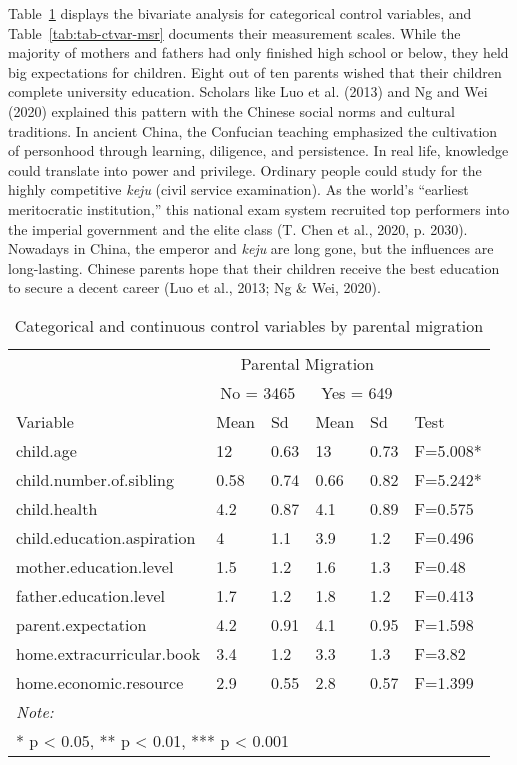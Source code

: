 \documentclass[
  man,floatsintext]{apa7}
\begin{document}
\newpage

Table~\ref{tab:tab-ctvar-cnt} displays the bivariate analysis for categorical control variables, and Table~\ref{tab:tab-ctvar-msr} documents their measurement scales. While the majority of mothers and fathers had only finished high school or below, they held big expectations for children. Eight out of ten parents wished that their children complete university education. Scholars like Luo et al. (2013) and Ng and Wei (2020) explained this pattern with the Chinese social norms and cultural traditions. In ancient China, the Confucian teaching emphasized the cultivation of personhood through learning, diligence, and persistence. In real life, knowledge could translate into power and privilege. Ordinary people could study for the highly competitive \emph{keju} (civil service examination). As the world's ``earliest meritocratic institution,'' this national exam system recruited top performers into the imperial government and the elite class (T. Chen et al., 2020, p. 2030). Nowadays in China, the emperor and \emph{keju} are long gone, but the influences are long-lasting. Chinese parents hope that their children receive the best education to secure a decent career (Luo et al., 2013; Ng \& Wei, 2020).

\begin{table}

\caption{\label{tab:tab-ctvar-cnt}Categorical and continuous control variables by parental migration}
\centering
\begin{tabular}[t]{llllll}
\toprule
\multicolumn{1}{c}{ } & \multicolumn{4}{c}{Parental Migration} \\
\cmidrule(l{3pt}r{3pt}){2-5}
\multicolumn{1}{c}{ } & \multicolumn{2}{c}{No = 3465} & \multicolumn{2}{c}{Yes = 649} \\
\cmidrule(l{3pt}r{3pt}){2-3} \cmidrule(l{3pt}r{3pt}){4-5}
Variable & Mean & Sd & Mean & Sd & Test\\
\midrule
child.age & 12 & 0.63 & 13 & 0.73 & F=5.008*\\
child.number.of.sibling & 0.58 & 0.74 & 0.66 & 0.82 & F=5.242*\\
child.health & 4.2 & 0.87 & 4.1 & 0.89 & F=0.575\\
child.education.aspiration & 4 & 1.1 & 3.9 & 1.2 & F=0.496\\
mother.education.level & 1.5 & 1.2 & 1.6 & 1.3 & F=0.48\\
\addlinespace
father.education.level & 1.7 & 1.2 & 1.8 & 1.2 & F=0.413\\
parent.expectation & 4.2 & 0.91 & 4.1 & 0.95 & F=1.598\\
home.extracurricular.book & 3.4 & 1.2 & 3.3 & 1.3 & F=3.82\\
home.economic.resource & 2.9 & 0.55 & 2.8 & 0.57 & F=1.399\\
\bottomrule
\multicolumn{6}{l}{\rule{0pt}{1em}\textit{Note: }}\\
\multicolumn{6}{l}{\rule{0pt}{1em}* p < 0.05, ** p < 0.01, *** p < 0.001}\\
\end{tabular}
\end{table}
\end{document}
